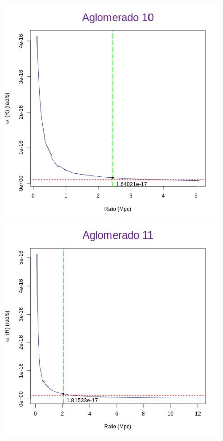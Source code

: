 \begin{apendicesenv}
\begin{figure}[H]
\begin{center}
\includegraphics[scale=.3]{04-figuras/selec20/perfil10}
\includegraphics[scale=.3]{04-figuras/selec20/perfil11}\hfill

\end{center}
\end{figure}
\end{apendicesenv}

